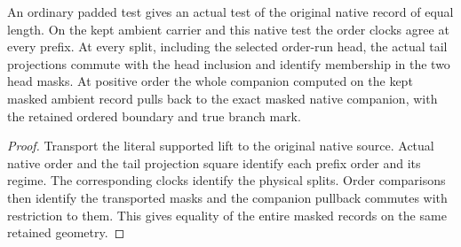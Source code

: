\begin{theorem}
\label{hir:g1-actual-normal-order-chronology}
\leanok
An ordinary padded test gives an actual test of the original
native record of equal length. On the kept ambient carrier
and this native test the order clocks agree at every prefix.
At every split, including the selected order-run head, the
actual tail projections commute with the head inclusion and
identify membership in the two head masks. At positive
order the whole companion computed on the kept masked
ambient record pulls back to the exact masked native
companion, with the retained ordered boundary and true branch mark.
\end{theorem}
\begin{proof}
Transport the literal supported lift to the original native
source. Actual native order and the tail projection square
identify each prefix order and its regime. The corresponding
clocks identify the physical splits. Order comparisons then
identify the transported masks and the companion pullback
commutes with restriction to them. This gives equality of
the entire masked records on the same retained geometry.
\end{proof}


